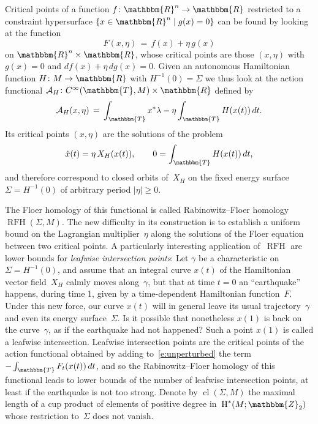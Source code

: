 \documentclass[12pt,twoside]{amsart}
\def\cuplength{\operatorname{cl}}
\theoremstyle{plain}
\numberwithin{figure}{section}
\numberwithin{equation}{section}
\def\H{\operatorname{H}}
\def\RFH{\operatorname{RFH}}
\def\gg{\gamma}
\def\ca{{\mathcal A}}
\def\RR{\mathbbm{R}}
\def\TT{\mathbbm{T}}
\def\ZZ{\mathbbm{Z}}
\begin{document}
Critical points of a function $f \colon \RR^n \to \RR$ restricted to a constraint hypersurface $\{ x \in \RR^n \mid g(x) =0\}$
can be found by looking at the function
$$
F(x,\eta) \,=\, f(x) + \eta \,g(x)
$$
on $\RR^n \times \RR$, whose critical points are those $(x,\eta)$ with $g(x) =0$
and $df(x) + \eta \,dg(x) =0$.
%
Given an autonomous Hamiltonian function 
$H \colon M \to \RR$ with $H^{-1}(0) =\Sigma$
we thus look at the action functional $\ca_H \colon C^\infty (\TT,M) \times \RR$ defined by
%
\begin{equation}  \label{e:unperturbed}
\ca_H (x,\eta) \,=\, \int_{\TT} x^*\lambda - \eta \int_{\TT} H (x(t)) \,dt .
\end{equation}
%
Its critical points $(x,\eta)$ are the solutions of the problem
$$
\dot x(t) = \eta \,X_H(x(t)), \qquad 0 =  \int_{\TT} H(x(t)) \, dt ,
$$
and therefore correspond to
%
closed orbits of~$X_H$ on the fixed energy surface 
$\Sigma = H^{-1}(0)$ of arbitrary period $|\eta| \geqslant 0$.

The Floer homology of this functional is called Rabinowitz--Floer homology $\RFH (\Sigma, M)$.
The new difficulty in its construction is to establish a uniform bound on the Lagrangian multiplier~$\eta$ 
along the solutions of the Floer equation between two critical points.
%
A particularly interesting application of~$\RFH$ are lower bounds for {\it leafwise intersection points}:
Let $\gg$ be a characteristic on $\Sigma = H^{-1}(0)$, and 
assume that an integral curve $x(t)$ of the Hamiltonian vector field~$X_H$ 
calmly moves along~$\gg$, but that at time $t=0$
an ``earthquake'' happens, during time 1, given by a time-dependent Hamiltonian function~$F$.
Under this new force, our curve $x(t)$ will in general leave its usual trajectory~$\gg$ 
and even its energy surface~$\Sigma$.
Is it possible that nonetheless $x(1)$ is back on the curve~$\gg$, 
as if the earthquake had not happened?
Such a point $x(1)$ is called a leafwise intersection.
Leafwise intersection points are the critical points of the action functional obtained by adding to~\eqref{e:unperturbed}
the term $-\int_{\TT} F_t(x(t)) \,dt$, and so the Rabinowitz--Floer homology of this functional leads to 
lower bounds of the number of leafwise intersection points, 
at least if the earthquake is not too strong.
%
Denote by $\cuplength (\Sigma,M)$ the maximal length of a cup product of elements of positive degree 
in~$\H^* (M;\ZZ_2)$ whose restriction to~$\Sigma$ does not vanish.
\end{document}
